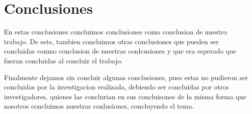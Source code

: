 \section{Conclusiones}


En estas conclusiones concluimos conclusiones como conclusion de nuestro trabajo. 
De este,  tambien concluimos otras conclusiones que pueden ser concluidas conmo conclusion de nuestras conlcusiones y que era esperado que fueran concluidas al concluir el trabajo.

Finalmente dejamos sin concluir algunas conclusiones, pues estas no pudieron ser concluidas por la investigacion realizada, debiendo ser concluidas por otros investigadores, quienes las conclurian en sus concluisones de la misma forma que nosotros concluimos  nuestras conlusiones, concluyendo el tema.